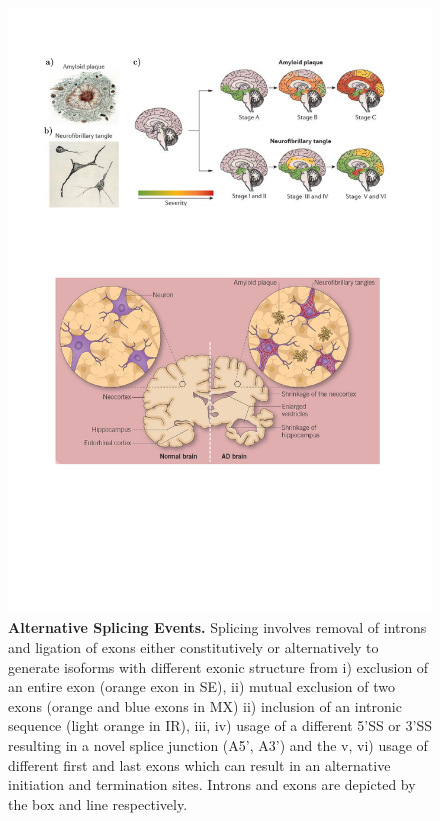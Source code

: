 \begin{figure}[!h]
	\centering
	\includegraphics[page=9,trim={0 16.5cm 0cm 0},clip, scale = 0.7]{Figures/Introduction_Figures.pdf}
	\captionsetup{width=0.95\textwidth,singlelinecheck=off}
	\caption[Alternative Splicing Events]%
	{\textbf{Alternative Splicing Events.} Splicing involves removal of introns and ligation of exons either constitutively or alternatively to generate isoforms with different exonic structure from i) exclusion of an entire exon (orange exon in SE), ii) mutual exclusion of two exons (orange and blue exons in MX) ii) inclusion of an intronic sequence (light orange in IR), iii, iv) usage of a different 5'SS or 3'SS resulting in a novel splice junction (A5', A3') and the v, vi) usage of different first and last exons which can result in an alternative initiation and termination sites. Introns and exons are depicted by the box and line respectively. 
	}
	\label{fig:AS_events}
\end{figure}

